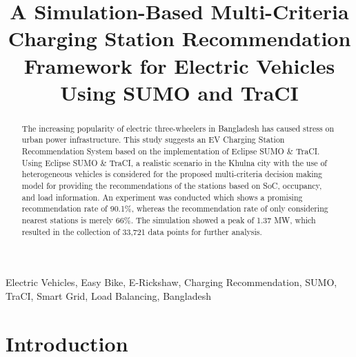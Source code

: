 \documentclass[conference]{IEEEtran}
\begin{document}
\title{A Simulation-Based Multi-Criteria Charging Station Recommendation Framework for
Electric Vehicles Using SUMO and TraCI}



\maketitle

\begin{abstract}
The increasing popularity of electric three-wheelers in Bangladesh has caused stress on urban power infrastructure. This study suggests an EV Charging Station Recommendation System based on the implementation of Eclipse SUMO \& TraCI. Using Eclipse SUMO \& TraCI, a realistic scenario in the Khulna city with the use of heterogeneous vehicles is considered for the proposed multi-criteria decision making model for providing the recommendations of the stations based on SoC, occupancy, and load information. An experiment was conducted which shows a promising recommendation rate of 90.1\%, whereas the recommendation rate of only considering nearest stations is merely 66\%. The simulation showed a peak of 1.37 MW, which resulted in the collection of 33,721 data points for further analysis.
\end{abstract}

\begin{IEEEkeywords}
Electric Vehicles, Easy Bike, E-Rickshaw, Charging Recommendation,
SUMO, TraCI, Smart Grid, Load Balancing, Bangladesh
\end{IEEEkeywords}

\vspace{-3mm}
\section{Introduction}
\end{document}
